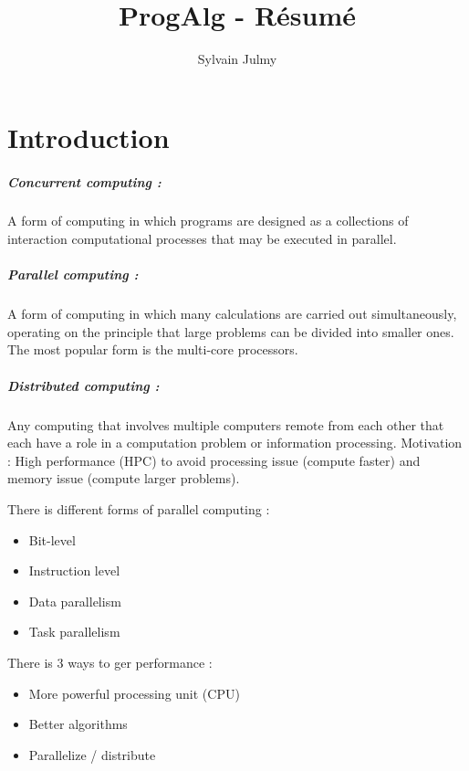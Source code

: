 \documentclass[11pt,a4paper]{report}
\author{Sylvain Julmy}
\title{ProgAlg - Résumé}
\begin{document}
\maketitle

\chapter{Introduction} %
\label{cha:Introduction}

\paragraph*{Concurrent computing :} A form of computing in which programs are designed as a collections of interaction computational processes that may be executed in parallel.

\paragraph*{Parallel computing :} A form of computing in which many calculations are carried out simultaneously, operating on the principle that large problems can be divided into smaller ones. The most popular form is the multi-core processors.

\paragraph*{Distributed computing :} Any computing that involves multiple computers remote from each other that each have a role in a computation problem or information processing. Motivation : High performance (HPC) to avoid processing issue (compute faster) and memory issue (compute larger problems).

There is different forms of parallel computing :
\begin{itemize}
    \item Bit-level
    \item Instruction level
    \item Data parallelism
    \item Task parallelism
\end{itemize}

There is $3$ ways to ger performance :
\begin{itemize}
    \item More powerful processing unit (CPU)
    \item Better algorithms
    \item Parallelize / distribute
\end{itemize}
\end{document}
